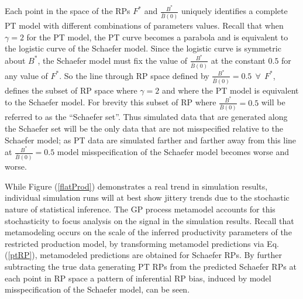 %
Each point in the space of the RPs $F^*$ and $\frac{B^*}{\bar B(0)}$ uniquely
identifies a complete PT model with different combinations of parameters values.
Recall that when $\gamma=2$ for the PT model, the PT curve becomes a parabola
and is equivalent to the logistic curve of the Schaefer model. Since the
logistic curve is symmetric about $B^*$, the Schaefer model must fix the value of
$\frac{B^*}{\bar B(0)}$ at the constant $0.5$ for any value of $F^*$. So
the line through RP space defined by $\frac{B^*}{\bar B(0)}=0.5 ~~ \forall ~~ F^*$,
defines the subset of RP space where $\gamma=2$ and where the PT model is
equivalent to the Schaefer model. For brevity this subset of RP where $\frac{B^*}{\bar B(0)}=0.5$
will be referred to as the ``Schaefer set''. Thus simulated data that are
generated along the Schaefer set will be the only data that are not
misspecified relative to the Schaefer model; as PT data are simulated
farther and farther away from this line at $\frac{B^*}{\bar B(0)}=0.5$ model
misspecification of the Schaefer model becomes worse and worse.


%
While Figure (\ref{flatProd}) demonstrates a real trend in simulation results,
individual simulation runs will at best show jittery trends due to the stochastic
nature of statistical inference. The GP process metamodel accounts for this
stochasticity %
to focus analysis on the signal in the simulation results. Recall that metamodeling
occurs on the scale of the inferred productivity parameters of the restricted
production model,
by transforming metamodel predictions via Eq. (\ref{ptRP}), metamodeled predictions
are obtained for Schaefer RPs. By further subtracting the true data generating
PT RPs from the predicted Schaefer RPs at each point in RP space a pattern of
inferential RP bias, induced by model misspecification of the Schaefer model,
can be seen. %

%

